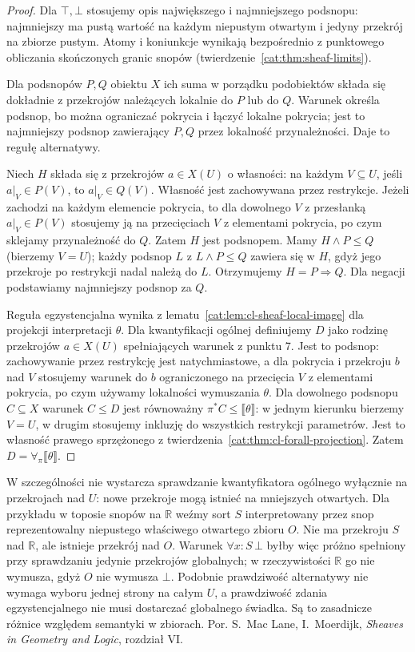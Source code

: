 \begin{proof}
Dla $\top,\bot$ stosujemy opis największego i najmniejszego podsnopu: najmniejszy ma pustą wartość na każdym niepustym otwartym i jedyny przekrój na zbiorze pustym. Atomy i koniunkcje wynikają bezpośrednio z punktowego obliczania skończonych granic snopów (twierdzenie~\ref{cat:thm:sheaf-limits}).

Dla podsnopów $P,Q$ obiektu $X$ ich suma w porządku podobiektów składa się dokładnie z przekrojów należących lokalnie do $P$ lub do $Q$. Warunek określa podsnop, bo można ograniczać pokrycia i łączyć lokalne pokrycia; jest to najmniejszy podsnop zawierający $P,Q$ przez lokalność przynależności. Daje to regułę alternatywy.

Niech $H$ składa się z przekrojów $a\in X(U)$ o własności: na każdym $V\subseteq U$, jeśli $a|_V\in P(V)$, to $a|_V\in Q(V)$. Własność jest zachowywana przez restrykcje. Jeżeli zachodzi na każdym elemencie pokrycia, to dla dowolnego $V$ z przesłanką $a|_V\in P(V)$ stosujemy ją na przecięciach $V$ z elementami pokrycia, po czym sklejamy przynależność do $Q$. Zatem $H$ jest podsnopem. Mamy $H\wedge P\leq Q$ (bierzemy $V=U$); każdy podsnop $L$ z $L\wedge P\leq Q$ zawiera się w $H$, gdyż jego przekroje po restrykcji nadal należą do $L$. Otrzymujemy $H=P\Rightarrow Q$. Dla negacji podstawiamy najmniejszy podsnop za $Q$.

Reguła egzystencjalna wynika z lematu~\ref{cat:lem:cl-sheaf-local-image} dla projekcji interpretacji $\theta$. Dla kwantyfikacji ogólnej definiujemy $D$ jako rodzinę przekrojów $a\in X(U)$ spełniających warunek z punktu 7. Jest to podsnop: zachowywanie przez restrykcję jest natychmiastowe, a dla pokrycia i przekroju $b$ nad $V$ stosujemy warunek do $b$ ograniczonego na przecięcia $V$ z elementami pokrycia, po czym używamy lokalności wymuszania $\theta$. Dla dowolnego podsnopu $C\subseteq X$ warunek $C\leq D$ jest równoważny $\pi^*C\leq\llbracket\theta\rrbracket$: w jednym kierunku bierzemy $V=U$, w drugim stosujemy inkluzję do wszystkich restrykcji parametrów. Jest to własność prawego sprzężonego z twierdzenia~\ref{cat:thm:cl-forall-projection}. Zatem $D=\forall_\pi\llbracket\theta\rrbracket$.
\end{proof}

W szczególności nie wystarcza sprawdzanie kwantyfikatora ogólnego wyłącznie na przekrojach nad $U$: nowe przekroje mogą istnieć na mniejszych otwartych. Dla przykładu w toposie snopów na $\mathbb R$ weźmy sort $S$ interpretowany przez snop reprezentowalny niepustego właściwego otwartego zbioru $O$. Nie ma przekroju $S$ nad $\mathbb R$, ale istnieje przekrój nad $O$. Warunek $\forall x:S\,\bot$ byłby więc próżno spełniony przy sprawdzaniu jedynie przekrojów globalnych; w rzeczywistości $\mathbb R$ go nie wymusza, gdyż $O$ nie wymusza $\bot$. Podobnie prawdziwość alternatywy nie wymaga wyboru jednej strony na całym $U$, a prawdziwość zdania egzystencjalnego nie musi dostarczać globalnego świadka. Są to zasadnicze różnice względem semantyki w zbiorach. Por. S.~Mac Lane, I.~Moerdijk, \emph{Sheaves in Geometry and Logic}, rozdział VI.

